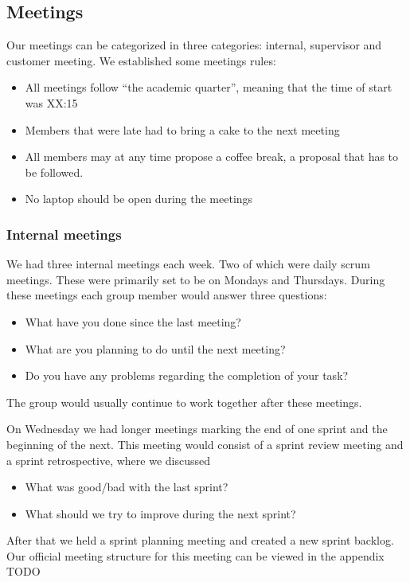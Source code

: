 \subsection{Meetings}
Our meetings can be categorized in three categories: internal, supervisor and
customer meeting. We established some meetings rules:
\begin{itemize}
    \item All meetings follow ``the academic quarter'', meaning that the time
        of start was XX:15
    \item Members that were late had to bring a cake to the next meeting
    \item All members may at any time propose a coffee break, a proposal that
        has to be followed. 
    \item No laptop should be open during the meetings
\end{itemize}

\subsubsection{Internal meetings}
We had three internal meetings each week. Two of which were daily scrum
meetings. These were primarily set to be on Mondays and Thursdays.
During these meetings each group member would answer three questions: 
\begin{itemize}
    \item What have you done since the last meeting?
    \item What are you planning to do until the next meeting?
    \item Do you have any problems regarding the completion of your task? 
\end{itemize}
The group would usually continue to work together after these meetings. 

On Wednesday we had longer meetings marking the end of one sprint and
the beginning of the next. This meeting would consist of a sprint
review meeting and a sprint retrospective, where we discussed
\begin{itemize}
    \item What was good/bad with the last sprint?
    \item What should we try to improve during the next sprint?
\end{itemize}
After that we held a sprint planning meeting and created a new sprint
backlog. Our official meeting structure for this meeting can be viewed in the
appendix TODO

